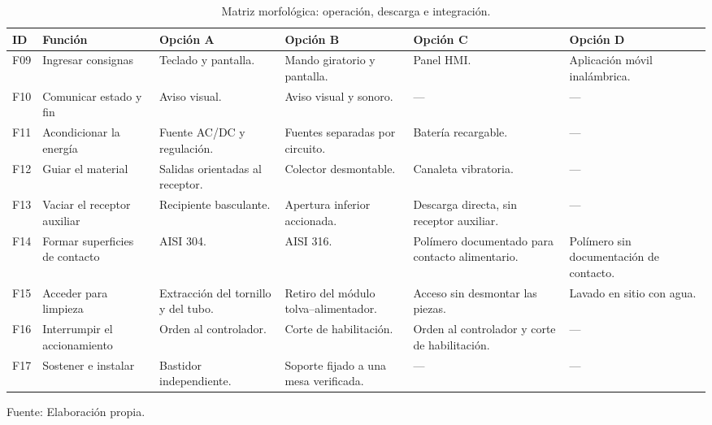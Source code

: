 \begin{table}[H]
    \centering
    \caption{Matriz morfológica: operación, descarga e integración.}
    \label{tab:morfologia_integracion}
    \footnotesize
    \setlength{\tabcolsep}{2.5pt}
    \renewcommand{\arraystretch}{1.15}
    \begin{tabularx}{\textwidth}{p{}>{\raggedright\arraybackslash}p{}*{4}{>{\raggedright\arraybackslash}X}}
        \toprule
        \textbf{ID} & \textbf{Función} & \textbf{Opción A} & \textbf{Opción B} & \textbf{Opción C} & \textbf{Opción D} \\
        \midrule
        F09 & Ingresar consignas & Teclado y pantalla. & Mando giratorio y pantalla. & Panel HMI. & Aplicación móvil inalámbrica. \\
        \addlinespace[2pt]
        F10 & Comunicar estado y fin & Aviso visual. & Aviso visual y sonoro. & --- & --- \\
        \addlinespace[2pt]
        F11 & Acondicionar la energía & Fuente AC/DC y regulación. & Fuentes separadas por circuito. & Batería recargable. & --- \\
        \addlinespace[2pt]
        F12 & Guiar el material & Salidas orientadas al receptor. & Colector desmontable. & Canaleta vibratoria. & --- \\
        \addlinespace[2pt]
        F13 & Vaciar el receptor auxiliar & Recipiente basculante. & Apertura inferior accionada. & Descarga directa, sin receptor auxiliar. & --- \\
        \addlinespace[2pt]
        F14 & Formar superficies de contacto & AISI 304. & AISI 316. & Polímero documentado para contacto alimentario. & Polímero sin documentación de contacto. \\
        \addlinespace[2pt]
        F15 & Acceder para limpieza & Extracción del tornillo y del tubo. & Retiro del módulo tolva--alimentador. & Acceso sin desmontar las piezas. & Lavado en sitio con agua. \\
        \addlinespace[2pt]
        F16 & Interrumpir el accionamiento & Orden al controlador. & Corte de habilitación. & Orden al controlador y corte de habilitación. & --- \\
        \addlinespace[2pt]
        F17 & Sostener e instalar & Bastidor independiente. & Soporte fijado a una mesa verificada. & --- & --- \\
        \bottomrule
    \end{tabularx}
    \par\smallskip
    Fuente: Elaboración propia.
\end{table}
